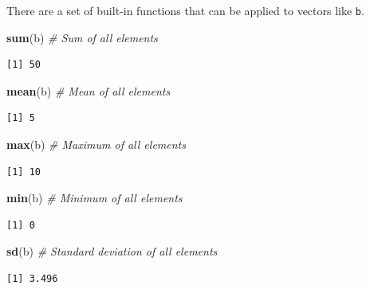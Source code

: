 \documentclass[12pt,]{book}
\newenvironment{Shaded}{\begin{snugshade}}{\end{snugshade}}
\newcommand{\CommentTok}[1]{\textcolor[rgb]{0.56,0.35,0.01}{\textit{#1}}}
\newcommand{\KeywordTok}[1]{\textcolor[rgb]{0.13,0.29,0.53}{\textbf{#1}}}
\newcommand{\NormalTok}[1]{#1}
\begin{document}
There are a set of built-in functions that can be applied to vectors like \texttt{b}.

\begin{Shaded}
\begin{Highlighting}[]
\KeywordTok{sum}\NormalTok{(b)      }\CommentTok{# Sum of all elements}
\end{Highlighting}
\end{Shaded}

\begin{verbatim}
[1] 50
\end{verbatim}

\begin{Shaded}
\begin{Highlighting}[]
\KeywordTok{mean}\NormalTok{(b)     }\CommentTok{# Mean of all elements}
\end{Highlighting}
\end{Shaded}

\begin{verbatim}
[1] 5
\end{verbatim}

\begin{Shaded}
\begin{Highlighting}[]
\KeywordTok{max}\NormalTok{(b)      }\CommentTok{# Maximum of all elements}
\end{Highlighting}
\end{Shaded}

\begin{verbatim}
[1] 10
\end{verbatim}

\begin{Shaded}
\begin{Highlighting}[]
\KeywordTok{min}\NormalTok{(b)      }\CommentTok{# Minimum of all elements}
\end{Highlighting}
\end{Shaded}

\begin{verbatim}
[1] 0
\end{verbatim}

\begin{Shaded}
\begin{Highlighting}[]
\KeywordTok{sd}\NormalTok{(b)       }\CommentTok{# Standard deviation of all elements}
\end{Highlighting}
\end{Shaded}

\begin{verbatim}
[1] 3.496
\end{verbatim}
\end{document}

